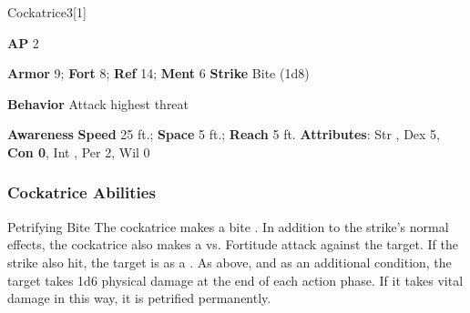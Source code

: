 \begin{monsection}{Cockatrice}{3}[1]
\vspace{-1em}\vspace{-1em}
\begin{spellcontent}
\begin{spelltargetinginfo}
{\textbf{AP} 2}

\pari \textbf{Armor} 9;
\textbf{Fort} 8;
\textbf{Ref} 14;
\textbf{Ment} 6
\pari \textbf{Strike} Bite  (1d8)



\pari \textbf{Behavior} Attack highest threat
\end{spelltargetinginfo}
\end{spellcontent}

\begin{monsterfooter}
\pari \textbf{Awareness} 
\pari \textbf{Speed} 25 ft.;
\textbf{Space} 5 ft.;
\textbf{Reach} 5 ft.
\pari \textbf{Attributes}:
Str ,
Dex 5,
\textbf{Con 0},
Int ,
Per 2,
Wil 0
\end{monsterfooter}
\end{monsection}


\subsubsection{Cockatrice Abilities}

\begin{ability}{Petrifying Bite}
The cockatrice makes a bite .
In addition to the strike's normal effects, the cockatrice also makes a  vs. Fortitude attack against the target.
\hit If the strike also hit, the target is  as a .
\crit As above, and as an additional condition, the target takes 1d6 physical damage at the end of each action phase.
If it takes vital damage in this way, it is petrified permanently.
\end{ability}






